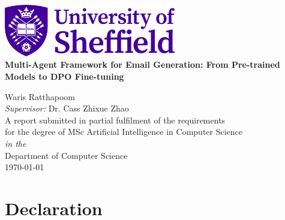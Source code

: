 \documentclass[11pt,oneside]{book}
\begin{document}
\let\cleardoublepage\clearpage
{}

\frontmatter

\begin{titlepage}


\begin{center}
\includegraphics[width=7.5cm]{images/UOSLogo.png}\\[1cm]
\linespread{1.2}\huge {\bfseries Multi-Agent Framework for Email Generation: From Pre-trained Models to DPO Fine-tuning}\\[1.5cm]
\linespread{1}

{\Large Waris Ratthapoom}\\[0.75cm]

{\large \emph{Supervisor:} Dr. Cass Zhixue Zhao}\\[1cm]
\large A report submitted in partial fulfilment of the requirements\\ for the degree of MSc Artificial Intelligence in Computer Science\\[0.3cm] 
\textit{in the}\\[0.3cm]
Department of Computer Science\\[2cm]
\today
\end{center}

\end{titlepage}


\newpage
\section*{\Large Declaration}
\end{document}

